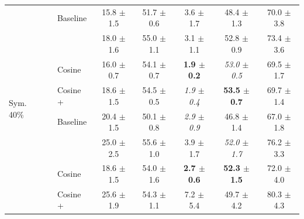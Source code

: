 \begin{table}[t]
{\begin{tabular}{lllccccc}
\midrule
\multirow{8}{*}{Sym. 40\%} & \multirow{4}{*}{\adamw{}} & Baseline & 15.8 $\pm$ 1.5 & 51.7 $\pm$ 0.6 & 3.6 $\pm$ 1.7 & 48.4 $\pm$ 1.3 & 70.0 $\pm$ 3.8 \\
 &  & \method{} & 18.0 $\pm$ 1.6 & 55.0 $\pm$ 1.1 & 3.1 $\pm$ 1.1 & 52.8 $\pm$ 0.9 & 73.4 $\pm$ 3.6 \\
 &  & Cosine & 16.0 $\pm$ 0.7 & 54.1 $\pm$ 0.7 & \textbf{1.9 $\pm$ 0.2} & \emph{53.0 $\pm$ 0.5} & 69.5 $\pm$ 1.7 \\
 &  & Cosine + \method{} & 18.6 $\pm$ 1.5 & 54.5 $\pm$ 0.5 & \emph{1.9 $\pm$ 0.4} & \textbf{53.5 $\pm$ 0.7} & 69.7 $\pm$ 1.4 \\
\cmidrule(lr){2-8}
 & \multirow{4}{*}{\sgdm{}} & Baseline & 20.4 $\pm$ 1.5 & 50.1 $\pm$ 0.8 & \emph{2.9 $\pm$ 0.9} & 46.8 $\pm$ 1.4 & 67.0 $\pm$ 1.8 \\
 &  & \method{} & 25.0 $\pm$ 2.5 & 55.6 $\pm$ 1.0 & 3.9 $\pm$ 1.7 & \emph{52.0 $\pm$ 1.7} & 76.2 $\pm$ 3.3 \\
 &  & Cosine & 18.6 $\pm$ 1.5 & 54.0 $\pm$ 1.6 & \textbf{2.7 $\pm$ 0.6} & \textbf{52.3 $\pm$ 1.5} & 72.0 $\pm$ 4.0 \\
 &  & Cosine + \method{} & 25.6 $\pm$ 1.9 & 54.3 $\pm$ 1.1 & 7.2 $\pm$ 5.4 & 49.7 $\pm$ 4.2 & 80.3 $\pm$ 4.3 \\
\bottomrule
\end{tabular}%
}
\end{table}

